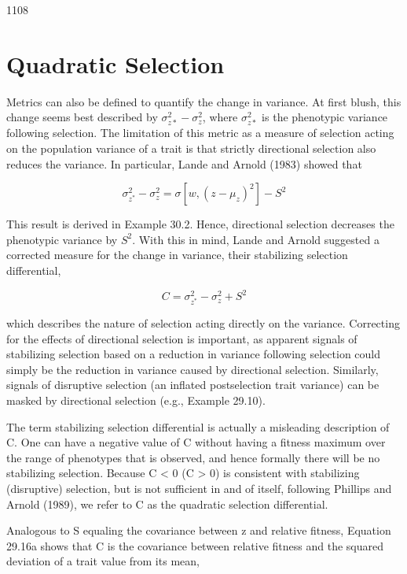 \documentclass{article}
\begin{document}
1108

\section{Quadratic Selection}
Metrics can also be defined to quantify the change in variance. At first blush, this change seems best described by  $ \sigma_{z*}^{2} - \sigma_{z}^{2} $, where  $ \sigma_{z*}^{2} $ is the phenotypic variance following selection. The limitation of this metric as a measure of selection acting on the population variance of a trait is that strictly directional selection also reduces the variance. In particular, Lande and Arnold (1983) showed that

\begin{equation}
\sigma_{z^{*}}^{2}-\sigma_{z}^{2}=\sigma\left[w,(z-\mu_{z})^{2}\right]-S^{2}
\tag{29.16a}
\label{eq:29_16a}
\end{equation}

This result is derived in Example 30.2. Hence, directional selection decreases the phenotypic variance by  $ S^{2} $. With this in mind, Lande and Arnold suggested a corrected measure for the change in variance, their stabilizing selection differential,

\begin{equation}
C=\sigma_{z^{*}}^{2}-\sigma_{z}^{2}+S^{2}
\tag{29.16b}
\label{eq:29_16b}
\end{equation}

which describes the nature of selection acting directly on the variance. Correcting for the effects of directional selection is important, as apparent signals of stabilizing selection based on a reduction in variance following selection could simply be the reduction in variance caused by directional selection. Similarly, signals of disruptive selection (an inflated postselection trait variance) can be masked by directional selection (e.g., Example 29.10).

The term stabilizing selection differential is actually a misleading description of C. One can have a negative value of C without having a fitness maximum over the range of phenotypes that is observed, and hence formally there will be no stabilizing selection. Because C < 0 (C > 0) is consistent with stabilizing (disruptive) selection, but is not sufficient in and of itself, following Phillips and Arnold (1989), we refer to C as the quadratic selection differential.

Analogous to S equaling the covariance between z and relative fitness, Equation 29.16a shows that C is the covariance between relative fitness and the squared deviation of a trait value from its mean,
\end{document}
